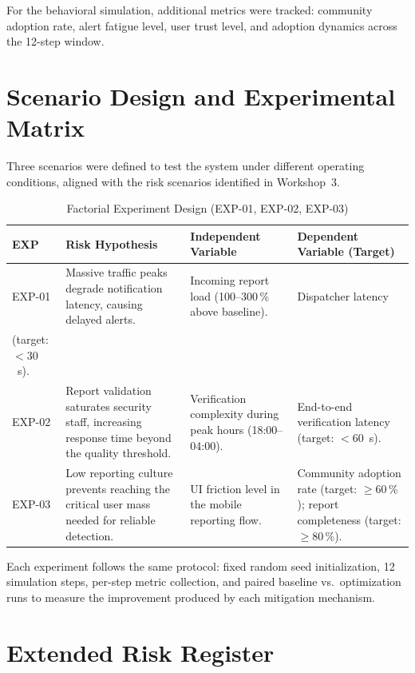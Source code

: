 \documentclass[conference,a4paper,10pt]{IEEEtran}
\begin{document}
For the behavioral simulation, additional metrics were tracked:
community adoption rate, alert fatigue level, user trust level, and
adoption dynamics across the 12-step window.

\section{Scenario Design and Experimental Matrix}

Three scenarios were defined to test the system under different
operating conditions, aligned with the risk scenarios identified in
Workshop~3.

\begin{table}[H]
\caption{Factorial Experiment Design (EXP-01, EXP-02, EXP-03)}
\label{tab:exp}\centering\small
\begin{tabular}{p{0.6cm}p{2.5cm}p{1.7cm}p{2.2cm}}
\toprule
\textbf{EXP} & \textbf{Risk Hypothesis} &
\textbf{Independent Variable} & \textbf{Dependent Variable (Target)}\\
\midrule
EXP-01 &
  Massive traffic peaks degrade notification latency, causing delayed
  alerts. &
  Incoming report load (100--300\,\% above baseline). &
  Dispatcher latency\\(target: $< 30$~s).\\[4pt]
EXP-02 &
  Report validation saturates security staff, increasing response
  time beyond the quality threshold. &
  Verification complexity during peak hours (18:00--04:00). &
  End-to-end verification latency (target: $< 60$~s).\\[4pt]
EXP-03 &
  Low reporting culture prevents reaching the critical user mass
  needed for reliable detection. &
  UI friction level in the mobile reporting flow. &
  Community adoption rate (target: $\geq 60\,\%$); report
  completeness (target: $\geq 80\,\%$).\\
\bottomrule
\end{tabular}
\end{table}

Each experiment follows the same protocol: fixed random seed
initialization, 12 simulation steps, per-step metric collection,
and paired baseline vs.\ optimization runs to measure the improvement
produced by each mitigation mechanism.

\section{Extended Risk Register}
\end{document}
